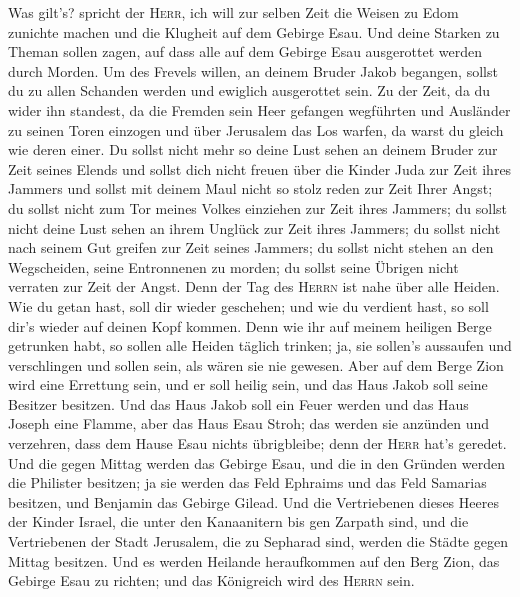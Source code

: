 Was gilt's? spricht der \textsc{Herr}, ich will zur
selben Zeit die Weisen zu Edom zunichte machen und die Klugheit auf dem
Gebirge Esau.  Und deine Starken zu Theman sollen zagen,
auf dass alle auf dem Gebirge Esau ausgerottet werden durch Morden.
 Um des Frevels willen, an deinem Bruder Jakob begangen,
sollst du zu allen Schanden werden und ewiglich ausgerottet sein.
 Zu der Zeit, da du wider ihn standest, da die Fremden
sein Heer gefangen wegführten und Ausländer zu seinen Toren einzogen und
über Jerusalem das Los warfen, da warst du gleich wie deren einer.
 Du sollst nicht mehr so deine Lust sehen an deinem
Bruder zur Zeit seines Elends und sollst dich nicht freuen über die
Kinder Juda zur Zeit ihres Jammers und sollst mit deinem Maul nicht so
stolz reden zur Zeit Ihrer Angst;  du sollst nicht zum
Tor meines Volkes einziehen zur Zeit ihres Jammers; du sollst nicht
deine Lust sehen an ihrem Unglück zur Zeit ihres Jammers; du sollst
nicht nach seinem Gut greifen zur Zeit seines Jammers; 
du sollst nicht stehen an den Wegscheiden, seine Entronnenen zu morden;
du sollst seine Übrigen nicht verraten zur Zeit der Angst.
 Denn der Tag des \textsc{Herrn} ist nahe über alle
Heiden. Wie du getan hast, soll dir wieder geschehen; und wie du
verdient hast, so soll dir's wieder auf deinen Kopf kommen.
 Denn wie ihr auf meinem heiligen Berge getrunken habt,
so sollen alle Heiden täglich trinken; ja, sie sollen's aussaufen und
verschlingen und sollen sein, als wären sie nie gewesen. 
Aber auf dem Berge Zion wird eine Errettung sein, und er soll heilig
sein, und das Haus Jakob soll seine Besitzer besitzen. 
Und das Haus Jakob soll ein Feuer werden und das Haus Joseph eine
Flamme, aber das Haus Esau Stroh; das werden sie anzünden und verzehren,
dass dem Hause Esau nichts übrigbleibe; denn der \textsc{Herr} hat's
geredet.  Und die gegen Mittag werden das Gebirge Esau,
und die in den Gründen werden die Philister besitzen; ja sie werden das
Feld Ephraims und das Feld Samarias besitzen, und Benjamin das Gebirge
Gilead.  Und die Vertriebenen dieses Heeres der Kinder
Israel, die unter den Kanaanitern bis gen Zarpath sind, und die
Vertriebenen der Stadt Jerusalem, die zu Sepharad sind, werden die
Städte gegen Mittag besitzen.  Und es werden Heilande
heraufkommen auf den Berg Zion, das Gebirge Esau zu richten; und das
Königreich wird des \textsc{Herrn} sein.
